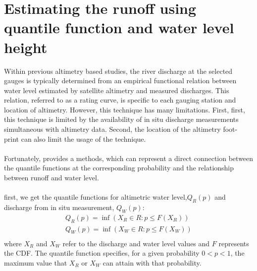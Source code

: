\section{Estimating the runoff using quantile function and water level height}
Within previous altimetry based studies, the river discharge at the selected gauges is typically determined from an empirical functional relation between water level estimated by satellite altimetry and measured discharges. This relation, referred to as a rating curve, is specific to each gauging station and location of altimetry. However, this technique has many limitations. First, first, this technique is limited by the availability of in situ discharge measurements simultaneous with altimetry data. Second, the location of the altimetry foot- print can also limit the usage of the technique.\\\\
Fortunately, \cite{tourian2013quantile} provides a methods, which can represent a direct connection between the quantile functions at the corresponding probability and the relationship between runoff and water level. \\\\
first, we get the quantile functions for altimetric water level,$Q_R(p)$ and discharge from in situ measurement, $Q_W(p)$:
\begin{gather*}
	Q_R(p) = \inf(X_R \in R: p\leq F(X_R)) \\
	Q_W(p) = \inf(X_W \in R: p\leq F(X_W)) \\
\end{gather*}
where $X_R$ and $X_W$ refer to the discharge and water level values and $F$ represents the CDF. The quantile function specifies, for a given probability $0 < p < 1$, the maximum value that $X_R$ or $X_W$ can attain with that probability.\\\\
